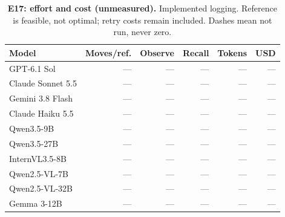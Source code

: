 \begin{table}[!ht]
\centering\small
\caption{\textbf{E17: effort and cost (unmeasured).} Implemented logging. Reference is feasible, not optimal; retry costs remain included. Dashes mean not run, never zero.}
\begin{tabularx}{\textwidth}{@{}Xrrrrr@{}}\toprule
Model & Moves/ref. & Observe & Recall & Tokens & USD\\\midrule
GPT-6.1 Sol & --- & --- & --- & --- & ---\\
Claude Sonnet 5.5 & --- & --- & --- & --- & ---\\
Gemini 3.8 Flash & --- & --- & --- & --- & ---\\
Claude Haiku 5.5 & --- & --- & --- & --- & ---\\
Qwen3.5-9B & --- & --- & --- & --- & ---\\
Qwen3.5-27B & --- & --- & --- & --- & ---\\
InternVL3.5-8B & --- & --- & --- & --- & ---\\
Qwen2.5-VL-7B & --- & --- & --- & --- & ---\\
Qwen2.5-VL-32B & --- & --- & --- & --- & ---\\
Gemma 3-12B & --- & --- & --- & --- & ---\\
\bottomrule
\end{tabularx}
\end{table}
